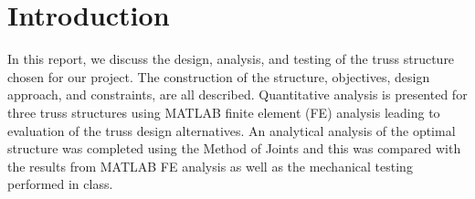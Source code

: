 \section{Introduction}


In this report, we discuss the design, analysis, and testing of the truss structure chosen for our project. 
The construction of the structure, objectives, design approach, and constraints, are all described. 
Quantitative analysis is presented for three truss structures using MATLAB finite element (FE) analysis leading to evaluation of the truss design alternatives. 
An analytical analysis of the optimal structure was completed using the Method of Joints and this was compared with the results from MATLAB FE analysis as well as the mechanical testing performed in class.

